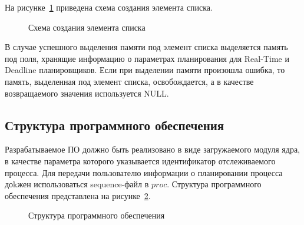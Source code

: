 На рисунке~\ref{fig:add} приведена схема создания элемента списка.

\begin{figure}[H]
	\centering
	
	\caption{Схема создания элемента списка}
	\label{fig:add}
\end{figure}

В случае успешного выделения памяти под элемент списка выделяется память под поля, хранящие информацию о параметрах планирования для Real-Time и Deadline планировщиков.
Если при выделении памяти произошла ошибка, то память, выделенная под элемент списка, освобождается, а в качестве возвращаемого значения используется NULL.

\subsection{Структура программного обеспечения}

Разрабатываемое ПО должно быть реализовано в виде загружаемого модуля ядра, в качестве параметра которого указывается идентификатор отслеживаемого процесса.
Для передачи пользователю информации о планировании процесса доkжен использоваться sequence-файл в $proc$.
Структура программного обеспечения представлена на рисунке~\ref{fig:program_structure}.
\begin{figure}[H]
	\centering
	
	\caption{Структура программного обеспечения}
	\label{fig:program_structure}
\end{figure}

